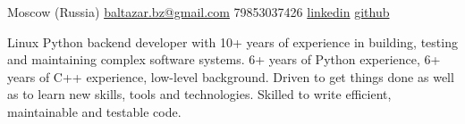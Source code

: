 \documentclass[unicode, 10pt, a4paper, oneside, fleqn]{article}
\begin{document}
\sloppy  %


\nobreakvspace{0.3em}  %

Moscow (Russia)
\sbull
\href{mailto:baltazar.bz@gmail.com}{baltazar.bz\mbox{}@\mbox{}gmail.com}\sbull
\textsmaller{+}79853037426\sbull
\href{http://ru.linkedin.com/pub/yuri-bochkarev/21/3a9/555}{linkedin}
\sbull
\href{https://github.com/balta2ar}{github}



\noindent
Linux Python backend developer with 10+ years of experience in
    building, testing and maintaining complex software systems. 6+ years of
    Python experience, 6+ years of C++ experience, low-level background.
    Driven to get things done as well as to learn new skills, tools and
    technologies. Skilled to write efficient, maintainable and testable code.



\end{document}
